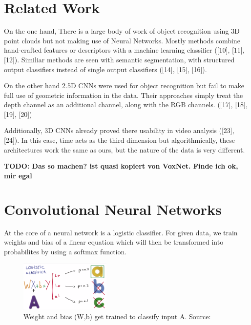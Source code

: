 \documentclass[10pt,twocolumn,letterpaper]{article}
\begin{document}

\section{Related Work}

On the one hand, There is a large body of work of object recognition using 3D point clouds but not making use of Neural Networks. 
Mostly methods combine hand-crafted features or descriptors with a machine learning classifier ([10], [11], [12]). 
Similiar methods are seen with semantic segmentation, with structured output classifiers instead of single output classifiers ([14], [15], [16]).

On the other hand 2.5D CNNs were used for object recognition but fail to make full use of geometric information in the data. Their approaches simply treat the depth channel as an additional channel, along with the RGB channels. ([17], [18], [19], [20]) 

Additionally, 3D CNNs already proved there usability in video analysis ([23], [24]). In this case, time acts as the third dimension but algorithmically, these architectures work the same as ours, but the nature of the data is very different.

\textbf{TODO: Das so machen? ist quasi kopiert von VoxNet. Finde ich ok, mir egal}

\section{Convolutional Neural Networks}

At the core of a neural network is a logistic classifier. 
For given data, we train weights and bias of a linear equation which will then be transformed into 
probabilites by using a softmax function. 

\begin{figure}[h]
	\label{fig:classifier}
	\centering
	\includegraphics[width=0.4\textwidth]{figures/classifier}
	\caption{Weight and bias (W,b) get trained to classify input A. Source: \cite{udacity}}
\end{figure}
\end{document}
